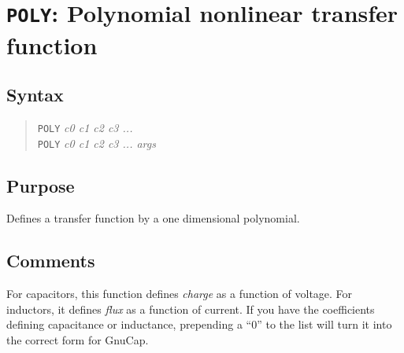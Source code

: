 %
%
%
%
\section{{\tt POLY}: Polynomial nonlinear transfer function}
\subsection{Syntax}
\begin{verse}
{\tt POLY} {\it c0 c1 c2 c3 ...}\\
{\tt POLY} {\it c0 c1 c2 c3 ... args}
\end{verse}
\subsection{Purpose}

Defines a transfer function by a one dimensional polynomial.
\subsection{Comments}

For capacitors, this function defines {\em charge} as a function of
voltage.  For inductors, it defines {\em flux} as a function of
current.  If you have the coefficients defining capacitance or
inductance, prepending a ``0'' to the list will turn it into the
correct form for GnuCap.

